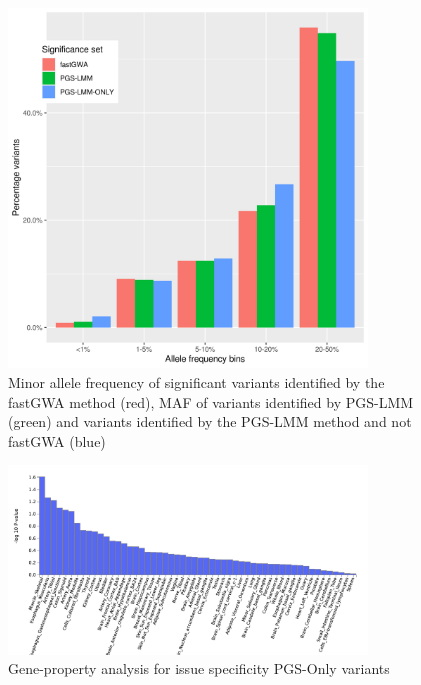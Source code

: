 \documentclass{article}
\begin{document}
\begin{figure}[h!]
  \includegraphics[width=0.85\textwidth]{images/SFig3.png}
  \vspace{-33pt}
  \caption[MAF plot]{Minor allele frequency of significant variants identified by the fastGWA method (red), MAF of variants identified by PGS-LMM (green) and variants identified by the PGS-LMM method and not fastGWA (blue)}
\end{figure}

\begin{figure}[h!]
  \includegraphics[width=0.85\textwidth]{images/SFig4.png}
  \caption{Gene-property analysis for issue specificity PGS-Only variants}
\end{figure}
\end{document}
